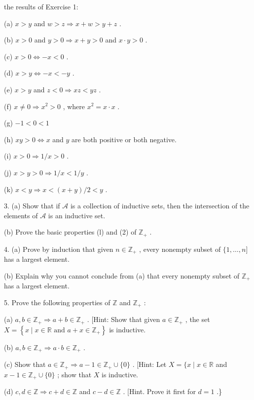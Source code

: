 the results of Exercise 1:

(a) \(x > y\) and \(w > z \Rightarrow  x + w > y + z\) .

(b) \(x > 0\) and \(y > 0 \Rightarrow  x + y > 0\) and \(x \cdot  y > 0\) .

(c) \(x > 0 \Leftrightarrow - x < 0\) .

(d) \(x > y \Leftrightarrow - x <  - y\) .

(e) \(x > y\) and \(z < 0 \Rightarrow  {xz} < {yz}\) .

(f) \(x \neq  0 \Rightarrow  {x}^{2} > 0\) , where \({x}^{2} = x \cdot  x\) .

(g) \(- 1 < 0 < 1\)

(h) \({xy} > 0 \Leftrightarrow  x\) and \(y\) are both positive or both negative.

(i) \(x > 0 \Rightarrow  1/x > 0\) .

(j) \(x > y > 0 \Rightarrow  1/x < 1/y\) .

(k) \(x < y \Rightarrow  x < \left( {x + y}\right) /2 < y\) .

3. (a) Show that if \(\mathcal{A}\) is a collection of inductive sets, then the intersection of the elements of \(\mathcal{A}\) is an inductive set.

(b) Prove the basic properties (l) and (2) of \({\mathbb{Z}}_{ + }\) .

4. (a) Prove by induction that given \(n \in  {\mathbb{Z}}_{ + }\) , every nonempty subset of \(\{ 1,\ldots ,n\rbrack\) has a largest element.

(b) Explain why you cannot conclude from (a) that every nonempty subset of \({\mathbb{Z}}_{ + }\) has a largest element.

5. Prove the following properties of \(\mathbb{Z}\) and \({\mathbb{Z}}_{ + }\) :

(a) \(a,b \in  {\mathbb{Z}}_{ + } \Rightarrow  a + b \in  {\mathbb{Z}}_{ + }\) . [Hint: Show that given \(a \in  {\mathbb{Z}}_{ + }\) , the set \(X = \left\{  {x \mid  x \in  \mathbb{R}\text{ and }a + x \in  {\mathbb{Z}}_{ + }}\right\}\) is inductive.

(b) \(a,b \in  {\mathbb{Z}}_{ + } \Rightarrow  a \cdot  b \in  {\mathbb{Z}}_{ + }\) .

(c) Show that \(a \in  {\mathbb{Z}}_{ + } \Rightarrow  a - 1 \in  {\mathbb{Z}}_{ + } \cup  \{ 0\}\) . [Hint: Let \(X = \{ x \mid  x \in  \mathbb{R}\) and \(x - 1 \in  {\mathbb{Z}}_{ + } \cup  \{ 0\}\) ; show that \(X\) is inductive.

(d) \(c,d \in  \mathbb{Z} \Rightarrow  c + d \in  \mathbb{Z}\) and \(c - d \in  \mathbb{Z}\) . [Hint. Prove it first for \(d = 1\) .\}

